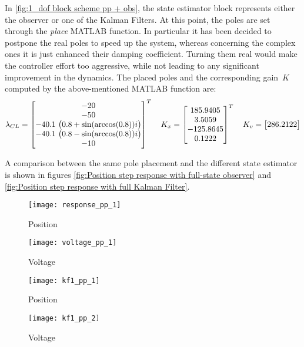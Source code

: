 In \cref{fig:1_dof block scheme pp + obs}, the state estimator block represents either the observer or one of the Kalman Filters. 
At this point, the poles are set through the \textit{place} MATLAB function. In particular it has been decided to postpone the real poles to speed up the system, whereas concerning the complex ones it is just enhanced their damping coefficient. Turning them real would make the controller effort too aggressive, while not leading to any significant improvement in the dynamics. The placed poles and the corresponding gain~$K$ computed by the above-mentioned MATLAB function are:
\begin{equation}
	\lambda_{CL} =
	\begin{bmatrix}
		-20 \\ -50 \\ -40.1\ \bigl{(} 0.8+\sin(\arccos(0.8))i \bigr{)} \\ -40.1\ \bigl{(} 0.8-\sin(\arccos(0.8))i \bigr{)} \\-10  
	\end{bmatrix}^{T}
	\quad
	K_x =
	\begin{bmatrix}
		185.9405 \\  3.5059 \\ -125.8645 \\ 0.1222
	\end{bmatrix}^T
	\quad
	K_v =
	\begin{bmatrix}
		286.2122
	\end{bmatrix}
\end{equation}

A comparison between the same pole placement and the different state estimator is shown in figures \cref{fig:Position step response with full-state observer} and \cref{fig:Position step response with full Kalman Filter}. 
\begin{figure*}[h]
	\centering
	\begin{subfigure}{0.45\columnwidth}
		\texttt{[image: response\_pp\_1]}
		\caption{Position}
	\end{subfigure}
	\begin{subfigure}{0.45\columnwidth}
		\texttt{[image: voltage\_pp\_1]}
		\caption{Voltage}
	\end{subfigure}
	\caption{Position step response with full-state observer}
	\label{fig:Position step response with full-state observer}
\end{figure*}

\begin{figure*}[h]
	\centering
	\begin{subfigure}{0.45\columnwidth}
		\texttt{[image: kf1\_pp\_1]}
		\caption{Position}
	\end{subfigure}
	\begin{subfigure}{0.45\columnwidth}
		\texttt{[image: kf1\_pp\_2]}
		\caption{Voltage}
	\end{subfigure}
	\caption{Position step response with full Kalman filter (potentiometer and enconder)}
	\label{fig:Position step response with full Kalman Filter}
\end{figure*}


